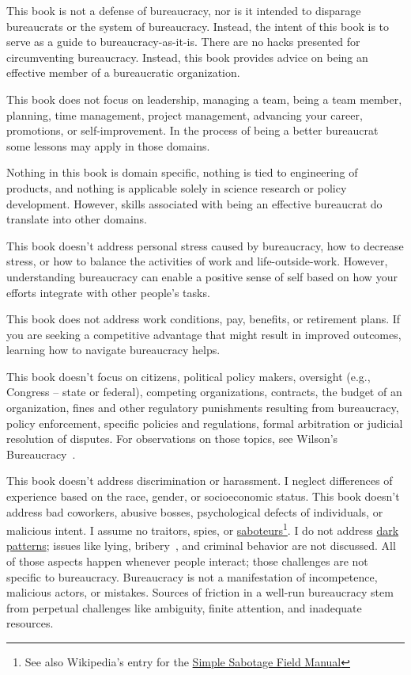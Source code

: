 This book is not a defense of bureaucracy, nor is it intended to disparage bureaucrats or the system of bureaucracy. Instead, the intent of this book is to serve as a guide to bureaucracy-as-it-is. There are no hacks presented for circumventing bureaucracy. Instead, this book provides advice on being an effective member of a bureaucratic organization.

This book does not focus on leadership, managing a team, being a team member, planning, time management, project management, advancing your career, promotions, or self-improvement. In the process of being a better bureaucrat some lessons may apply in those domains.


Nothing in this book is domain specific, nothing is tied to engineering of products, and nothing is applicable solely in science research or policy development. However, skills associated with being an effective bureaucrat do translate into other domains.

This book doesn't address personal stress caused by bureaucracy, how to decrease stress, or how to balance the activities of work and life-outside-work.   However, understanding bureaucracy can enable a positive sense of self based on how your efforts integrate with other people's tasks. 

This book does not address work conditions, pay, benefits, or retirement plans. If you are seeking a competitive advantage that might result in improved outcomes, learning how to navigate bureaucracy helps.


This book doesn't focus on citizens, political policy makers, oversight (e.g., Congress -- state or federal), competing organizations, contracts, the budget of an organization, fines and other regulatory punishments resulting from bureaucracy, policy enforcement, specific policies and regulations, formal arbitration or judicial resolution of disputes. For observations on those topics, see Wilson's Bureaucracy~\cite{1991_Wilson}. 


This book doesn't address discrimination or harassment. I neglect differences of experience based on the race, gender, or socioeconomic status. This book doesn't address bad coworkers, abusive bosses, psychological defects of individuals, or malicious intent. I assume no traitors, spies, or \href{https://www.hsdl.org/?abstract&did=750070}{saboteurs}\footnote{See also Wikipedia's entry for the \href{https://en.wikisource.org/wiki/Simple_Sabotage_Field_Manual}{Simple Sabotage Field Manual}}.
I do not address \href{https://en.wikipedia.org/wiki/Dark_pattern}{dark patterns}; issues like lying, bribery~\cite{2021_Ang}, and criminal behavior are not discussed. All of those aspects happen whenever people interact; those challenges are not specific to bureaucracy. 
Bureaucracy is not a manifestation of incompetence, malicious actors, or mistakes. Sources of friction in a well-run bureaucracy stem from perpetual challenges like ambiguity, finite attention, and inadequate resources.


